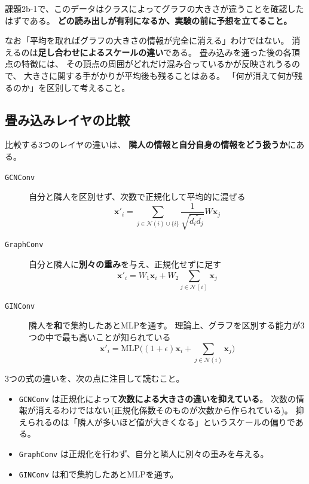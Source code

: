 \documentclass[11pt,a4paper]{jsarticle}
\begin{document}
\noindent
課題2b-1で、このデータはクラスによってグラフの大きさが違うことを確認したはずである。
\textbf{どの読み出しが有利になるか、実験の前に予想を立てること。}

なお「平均を取ればグラフの大きさの情報が完全に消える」わけではない。
消えるのは\textbf{足し合わせによるスケールの違い}である。
畳み込みを通った後の各頂点の特徴には、
その頂点の周囲がどれだけ混み合っているかが反映されうるので、
大きさに関する手がかりが平均後も残ることはある。
「何が消えて何が残るのか」を区別して考えること。

\subsection{畳み込みレイヤの比較}

比較する3つのレイヤの違いは、
\textbf{隣人の情報と自分自身の情報をどう扱うか}にある。

\begin{description}
\item[\texttt{GCNConv}] 自分と隣人を区別せず、次数で正規化して平均的に混ぜる
\begin{equation}
\bm{x}'_i=\sum_{j\in\mathcal{N}(i)\cup\{i\}}\frac{1}{\sqrt{\tilde{d}_i\tilde{d}_j}}W\bm{x}_j
\end{equation}

\item[\texttt{GraphConv}] 自分と隣人に\textbf{別々の重み}を与え、正規化せずに足す
\begin{equation}
\bm{x}'_i=W_1\bm{x}_i+W_2\sum_{j\in\mathcal{N}(i)}\bm{x}_j
\end{equation}

\item[\texttt{GINConv}] 隣人を\textbf{和}で集約したあとMLPを通す。
理論上、グラフを区別する能力が3つの中で最も高いことが知られている
\begin{equation}
\bm{x}'_i=\mathrm{MLP}\Big((1+\epsilon)\bm{x}_i+\sum_{j\in\mathcal{N}(i)}\bm{x}_j\Big)
\end{equation}
\end{description}

\noindent
3つの式の違いを、次の点に注目して読むこと。

\begin{itemize}
\item \verb|GCNConv| は正規化によって\textbf{次数による大きさの違いを抑えている}。
  次数の情報が消えるわけではない(正規化係数そのものが次数から作られている)。
  抑えられるのは「隣人が多いほど値が大きくなる」というスケールの偏りである。
\item \verb|GraphConv| は正規化を行わず、自分と隣人に別々の重みを与える。
\item \verb|GINConv| は和で集約したあとMLPを通す。
\end{itemize}
\end{document}

